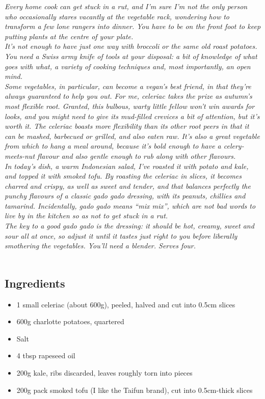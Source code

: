 \documentclass{book}
\begin{document}
\emph{Every home cook can get stuck in a rut, and I’m sure I’m not the only person who occasionally stares vacantly at the vegetable rack, wondering how to transform a few lone rangers into dinner. You have to be on the front foot to keep putting plants at the centre of your plate.\\ 
It’s not enough to have just one way with broccoli or the same old roast potatoes. You need a Swiss army knife of tools at your disposal: a bit of knowledge of what goes with what, a variety of cooking techniques and, most importantly, an open mind.\\ 
Some vegetables, in particular, can become a vegan’s best friend, in that they’re always guaranteed to help you out. For me, celeriac takes the prize as autumn’s most flexible root. Granted, this bulbous, warty little fellow won’t win awards for looks, and you might need to give its mud-filled crevices a bit of attention, but it’s worth it. The celeriac boasts more flexibility than its other root peers in that it can be mashed, barbecued or grilled, and also eaten raw. It’s also a great vegetable from which to hang a meal around, because it’s bold enough to have a celery-meets-nut flavour and also gentle enough to rub along with other flavours.\\ 
In today’s dish, a warm Indonesian salad, I’ve roasted it with potato and kale, and topped it with smoked tofu. By roasting the celeriac in slices, it becomes charred and crispy, as well as sweet and tender, and that balances perfectly the punchy flavours of a classic gado gado dressing, with its peanuts, chillies and tamarind. Incidentally, gado gado means “mix mix”, which are not bad words to live by in the kitchen so as not to get stuck in a rut.\\ 
The key to a good gado gado is the dressing: it should be hot, creamy, sweet and sour all at once, so adjust it until it tastes just right to you before liberally smothering the vegetables. You’ll need a blender. Serves four.}\\\\ 
\subsection*{Ingredients}
\begin{itemize}
\item 1 small celeriac (about 600g), peeled, halved and cut into 0.5cm slices
\item 600g charlotte potatoes, quartered
\item Salt
\item 4 tbsp rapeseed oil
\item 200g kale, ribs discarded, leaves roughly torn into pieces
\item 200g pack smoked tofu (I like the Taifun brand), cut into 0.5cm-thick slices
\end{itemize}
\end{document}
